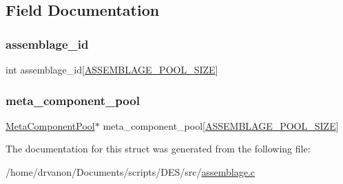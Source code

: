 \subsection{Field Documentation}
\mbox{\label{struct_assemblage_pool_ae15fe47459f6c895149f5153965c7570}} 
\subsubsection{\texorpdfstring{assemblage\+\_\+id}{assemblage\_id}}
{\footnotesize\ttfamily int assemblage\+\_\+id\mbox{[}\mbox{\hyperlink{assemblage_8c_a7278dc587e6d944803677e7662c25147}{A\+S\+S\+E\+M\+B\+L\+A\+G\+E\+\_\+\+P\+O\+O\+L\+\_\+\+S\+I\+ZE}}\mbox{]}}

\mbox{\label{struct_assemblage_pool_a84508fb56f488124e510895704581e33}} 
\subsubsection{\texorpdfstring{meta\+\_\+component\+\_\+pool}{meta\_component\_pool}}
{\footnotesize\ttfamily \mbox{\hyperlink{struct_meta_component_pool}{Meta\+Component\+Pool}}$\ast$ meta\+\_\+component\+\_\+pool\mbox{[}\mbox{\hyperlink{assemblage_8c_a7278dc587e6d944803677e7662c25147}{A\+S\+S\+E\+M\+B\+L\+A\+G\+E\+\_\+\+P\+O\+O\+L\+\_\+\+S\+I\+ZE}}\mbox{]}}



The documentation for this struct was generated from the following file\+:\begin{DoxyCompactItemize}
\item 
/home/drvanon/\+Documents/scripts/\+D\+E\+S/src/\mbox{\hyperlink{assemblage_8c}{assemblage.\+c}}\end{DoxyCompactItemize}
